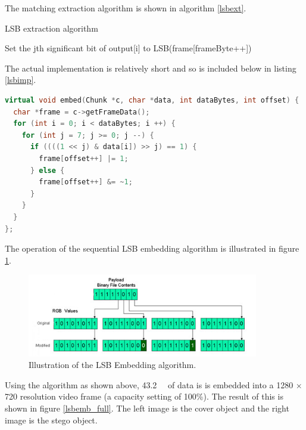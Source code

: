 \documentclass[paper=a4, fontsize=11pt,twoside]{scrartcl}    %
\numberwithin{table}{section}
\numberwithin{figure}{section}
\numberwithin{algorithm}{section}
\begin{document}
\noindent
The matching extraction algorithm is shown in algorithm \ref{lsbext}.

\begin{algorithm}
\caption{LSB extraction algorithm}
\label{lsbext}
\begin{algorithmic}[1]
		\State Set the jth significant bit of output[i] to LSB(frame[frameByte++]) 
	\EndFor
\EndFor
\end{algorithmic}
\end{algorithm}

\noindent
The actual implementation is relatively short and so is included below in listing \ref{lsbimp}.

\begin{lstlisting}[language=C++, caption={LSB implementation (\texttt{steg/lsb\_algorithm.cc:8})}, frame=single, label=lsbimp,float,floatplacement=H]
virtual void embed(Chunk *c, char *data, int dataBytes, int offset) {
  char *frame = c->getFrameData();
  for (int i = 0; i < dataBytes; i ++) {
    for (int j = 7; j >= 0; j --) {
      if ((((1 << j) & data[i]) >> j) == 1) {
        frame[offset++] |= 1;
      } else {
        frame[offset++] &= ~1;
      }
    }
  }
};
\end{lstlisting}

\noindent
The operation of the sequential LSB embedding algorithm is illustrated in figure \ref{lsbill}.

\begin{figure}[here]
\centerline{\includegraphics[width=0.9\textwidth]{images/lsb_ill.png}}
\caption{Illustration of the LSB Embedding algorithm.}
\label{lsbill}
\end{figure}

\noindent
Using the algorithm as shown above, \SI{43.2}{\kilo\byte} of data is is embedded into a 1280 $\times$ 720 resolution video frame (a capacity setting of 100\%). The result of this is shown in figure \ref{lsbemb_full}. The left image is the cover object and the right image is the stego object. 
\end{document}

